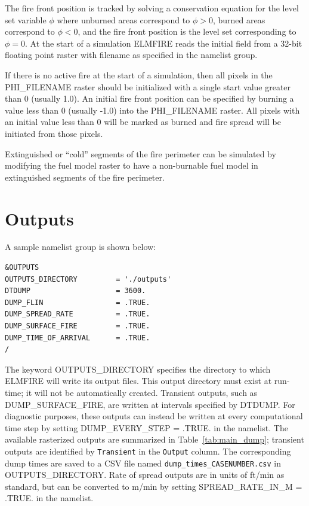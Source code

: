 The fire front position is tracked by solving a conservation equation for the level set variable $\phi$ where unburned areas correspond to 
$\phi > 0$, burned areas correspond to 
$\phi < 0$, and the fire front position is the level set corresponding to 
$\phi = 0$. At the start of a simulation ELMFIRE reads the initial 
field from a 32-bit floating point raster with filename  as specified in the  namelist group.

If there is no active fire at the start of a simulation, then all pixels in the PHI\_FILENAME raster should be initialized with a single start value greater than 0 (usually 1.0). An initial fire front position can be specified by burning a value less than 0 (usually -1.0) into the PHI\_FILENAME raster. All pixels with an initial 
value less than 0 will be marked as burned and fire spread will be initiated from those pixels.

Extinguished or “cold” segments of the fire perimeter can be simulated by modifying the fuel model raster to have a non-burnable fuel model in extinguished segments of the fire perimeter.

\section{Outputs}
\label{outputs}

A sample  namelist group is shown below:

\begin{verbatim}
&OUTPUTS
OUTPUTS_DIRECTORY         = './outputs'
DTDUMP                    = 3600.
DUMP_FLIN                 = .TRUE.
DUMP_SPREAD_RATE          = .TRUE.
DUMP_SURFACE_FIRE         = .TRUE.
DUMP_TIME_OF_ARRIVAL      = .TRUE.
/
\end{verbatim}

The keyword OUTPUTS\_DIRECTORY specifies the directory to which ELMFIRE will write its output files. This output directory must exist at run-time; it will not be automatically created. Transient outputs, such as DUMP\_SURFACE\_FIRE, are written at intervals specified by DTDUMP. For diagnostic purposes, these outputs can instead be written at every computational time step by setting DUMP\_EVERY\_STEP = .TRUE. in the  namelist. The available rasterized outputs are summarized in Table~\ref{tab:main_dump}; transient outputs are identified by \texttt{Transient} in the \texttt{Output} column. The corresponding dump times are saved to a CSV file named \texttt{dump\_times\_CASENUMBER.csv} in OUTPUTS\_DIRECTORY. Rate of spread outputs are in units of ft/min as standard, but can be converted to m/min by setting SPREAD\_RATE\_IN\_M = .TRUE. in the  namelist.

